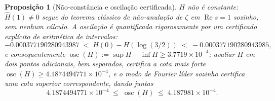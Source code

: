 \documentclass[11pt]{amsart}
\theoremstyle{plain}
\newtheorem{proposition}[theorem]{Proposição}
\theoremstyle{definition}
\theoremstyle{remark}
\begin{document}
\begin{proposition}[Não-constância e oscilação certificada]
\label{prop:Hcert}
$H$ não é constante: $\hat H(1)\ne0$ segue do teorema clássico de não-anulação de $\zeta$ em
$\operatorname{Re}s=1$ sozinho, sem nenhum cálculo. A oscilação é quantificada rigorosamente por um
certificado explícito de aritmética de intervalos:
\[
-0.000377190280943987 \;<\; H(0) - H(\log(3/2)) \;<\; -0.000377190280943985,
\]
e consequentemente $\operatorname{osc}(H) := \sup H - \inf H \ge 3.7719\times 10^{-4}$; avaliar $H$
em dois pontos adicionais, bem separados, certifica a cota mais forte
$\operatorname{osc}(H) \ge 4.1874494771\times10^{-4}$, e o modo de Fourier líder sozinho certifica
uma cota superior correspondente, dando juntas
\[
4.1874494771\times10^{-4} \;\le\; \operatorname{osc}(H) \;\le\; 4.187981\times10^{-4}.
\]
\end{proposition}
\end{document}
